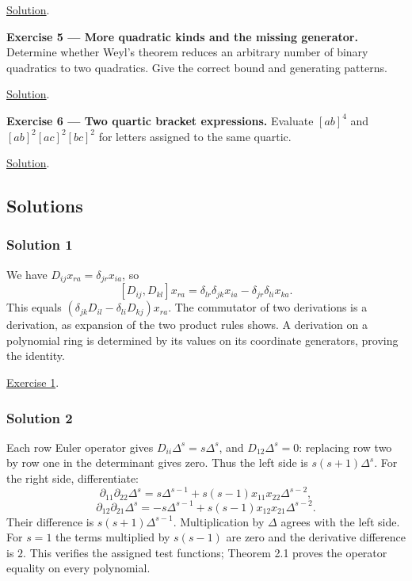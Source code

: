 \documentclass[
]{article}
\begin{document}
\hyperref[solution-4]{Solution}.

\protect{}\label{exercise-5}{}

\textbf{Exercise 5 --- More quadratic kinds and the missing generator.}
Determine whether Weyl's theorem reduces an arbitrary number of binary
quadratics to two quadratics. Give the correct bound and generating
patterns.

\hyperref[solution-5]{Solution}.

\protect{}\label{exercise-6}{}

\textbf{Exercise 6 --- Two quartic bracket expressions.} Evaluate
\([ab]^4\) and \([ab]^2 [ac]^2 [bc]^2\) for letters assigned to the same
quartic.

\hyperref[solution-6]{Solution}.

\subsection{Solutions}\label{solutions}

\subsubsection{Solution 1}\label{solution-1}

We have \(D_{ij}x_{ra}=\delta_{jr}x_{ia}\), so \[
[D_{ij},D_{kl}]x_{ra}
=\delta_{lr}\delta_{jk}x_{ia}
-\delta_{jr}\delta_{li}x_{ka}.
\] This equals \((\delta_{jk}D_{il}-\delta_{li}D_{kj})x_{ra}\). The
commutator of two derivations is a derivation, as expansion of the two
product rules shows. A derivation on a polynomial ring is determined by
its values on its coordinate generators, proving the identity.

\hyperref[exercise-1]{Exercise 1}.

\subsubsection{Solution 2}\label{solution-2}

Each row Euler operator gives \(D_{ii}\Delta^s=s\Delta^s\), and
\(D_{12}\Delta^s=0\): replacing row two by row one in the determinant
gives zero. Thus the left side is \(s(s+1)\Delta^s\). For the right
side, differentiate: \[
\partial_{11}\partial_{22}\Delta^s
=s\Delta^{s-1}+s(s-1)x_{11}x_{22}\Delta^{s-2},
\] \[
\partial_{12}\partial_{21}\Delta^s
=-s\Delta^{s-1}+s(s-1)x_{12}x_{21}\Delta^{s-2}.
\] Their difference is \(s(s+1)\Delta^{s-1}\). Multiplication by
\(\Delta\) agrees with the left side. For \(s=1\) the terms multiplied
by \(s(s-1)\) are zero and the derivative difference is \(2\). This
verifies the assigned test functions; Theorem 2.1 proves the operator
equality on every polynomial.
\end{document}
